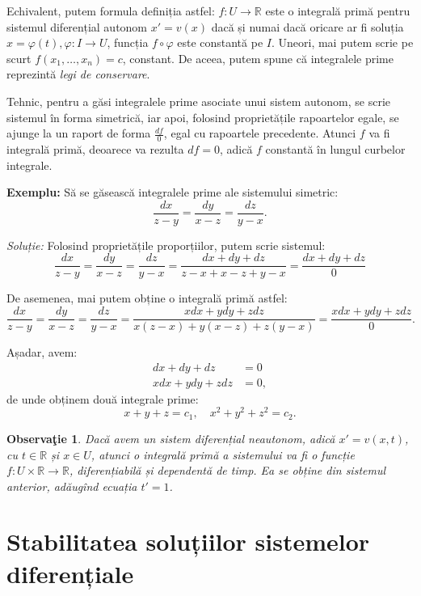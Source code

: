 \documentclass[11pt,a4paper]{article}
\newcommand\RR{\mathbb{R}}
\theoremstyle{dotless}
\theoremstyle{dotlessdr}
\newtheorem{remark}{Observa\c{t}ie}[section]
\begin{document}
Echivalent, putem formula definiția astfel: $f : U \to \RR$ este o integrală
primă pentru sistemul diferențial autonom $x' = v(x)$ dacă și numai dacă oricare
ar fi soluția $x = \varphi(t), \varphi : I \to U$, funcția $f \circ \varphi$ este
constantă pe $I$. Uneori, mai putem scrie pe scurt $f(x_1, \dots, x_n) = c$, constant.
De aceea, putem spune că integralele prime reprezintă \emph{legi de conservare}.

Tehnic, pentru a găsi integralele prime asociate unui sistem autonom, se scrie
sistemul în forma simetrică, iar apoi, folosind proprietățile rapoartelor egale,
se ajunge la un raport de forma $\frac{df}{0}$, egal cu rapoartele precedente.
Atunci $f$ va fi integrală primă, deoarece va rezulta $df = 0$, adică $f$ constantă
în lungul curbelor integrale.

\textbf{Exemplu:} Să se găsească integralele prime ale sistemului simetric:
\[
  \frac{dx}{z - y} = \frac{dy}{x - z} = \frac{dz}{y - x}.
\]

\emph{Soluție:} Folosind proprietățile proporțiilor, putem scrie sistemul:
\[
  \frac{dx}{z - y} = \frac{dy}{x - z} = \frac{dz}{y - x} = %
  \frac{dx + dy + dz}{z - x + x - z + y - x} = \frac{dx + dy + dz}{0}
\]

De asemenea, mai putem obține o integrală primă astfel:
\[
  \frac{dx}{z - y} = \frac{dy}{x - z} = \frac{dz}{y - x} = %
  \frac{xdx + ydy + zdz}{x(z - x) + y(x - z) + z(y - x)} = %
  \frac{xdx + ydy + zdz}{0}.
\]

Așadar, avem:
\begin{align*}
  dx + dy + dz &= 0 \\
  xdx + ydy + zdz &= 0,
\end{align*}
de unde obținem două integrale prime:
\[
  x + y + z = c_1, \quad x^2 + y^2 + z^2 = c_2.
\]

\begin{remark}\label{rk:int-prima-t}
  Dacă avem un sistem diferențial neautonom, adică $x' = v(x, t)$, cu $t \in \RR$
  și $x \in U$, atunci o integrală primă a sistemului va fi o funcție
  $f : U \times \RR \to \RR$, diferențiabilă și \emph{dependentă de timp}. Ea
  se obține din sistemul anterior, adăugînd ecuația $t' = 1$.
\end{remark}


\section{Stabilitatea soluțiilor sistemelor diferențiale}
\end{document}
